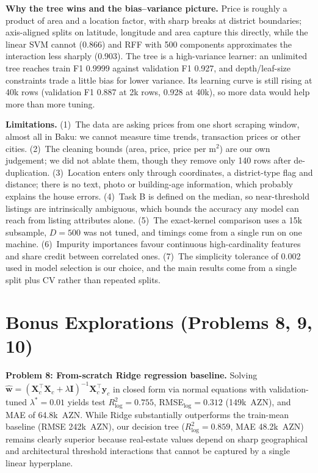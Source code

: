 \documentclass[10pt,twocolumn,a4paper]{article}
\begin{document}
\textbf{Why the tree wins and the bias--variance picture.} Price is roughly a product of area and a location factor, with sharp breaks at district boundaries; axis-aligned splits on latitude, longitude and area capture this directly, while the linear SVM cannot (0.866) and RFF with 500 components approximates the interaction less sharply (0.903).
The tree is a high-variance learner: an unlimited tree reaches train F1 0.9999 against validation F1 0.927, and depth/leaf-size constraints trade a little bias for lower variance. Its learning curve is still rising at 40k rows (validation F1 0.887 at 2k rows, 0.928 at 40k), so more data would help more than more tuning.

\textbf{Limitations.}
(1)~The data are asking prices from one short scraping window, almost all in Baku: we cannot measure time trends, transaction prices or other cities.
(2)~The cleaning bounds (area, price, price per m$^2$) are our own judgement; we did not ablate them, though they remove only 140 rows after de-duplication.
(3)~Location enters only through coordinates, a district-type flag and distance; there is no text, photo or building-age information, which probably explains the house errors.
(4)~Task B is defined on the median, so near-threshold listings are intrinsically ambiguous, which bounds the accuracy any model can reach from listing attributes alone.
(5)~The exact-kernel comparison uses a 15k subsample, $D=500$ was not tuned, and timings come from a single run on one machine.
(6)~Impurity importances favour continuous high-cardinality features and share credit between correlated ones.
(7)~The simplicity tolerance of 0.002 used in model selection is our choice, and the main results come from a single split plus CV rather than repeated splits.

\section{Bonus Explorations (Problems 8, 9, 10)}
\textbf{Problem 8: From-scratch Ridge regression baseline.}
Solving $\hat{\mathbf{w}} = (\mathbf{X}_c^\top \mathbf{X}_c + \lambda \mathbf{I})^{-1} \mathbf{X}_c^\top \mathbf{y}_c$ in closed form via normal equations with validation-tuned $\lambda^* = 0.01$ yields test $R^2_{\log} = 0.755$, RMSE$_{\log} = 0.312$ (149k~AZN), and MAE of 64.8k~AZN. While Ridge substantially outperforms the train-mean baseline (RMSE 242k~AZN), our decision tree ($R^2_{\log} = 0.859$, MAE 48.2k~AZN) remains clearly superior because real-estate values depend on sharp geographical and architectural threshold interactions that cannot be captured by a single linear hyperplane.
\end{document}
